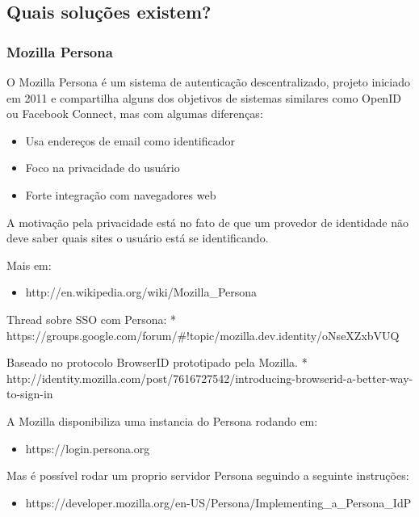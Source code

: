 \documentclass[11pt]{article}
\begin{document}

\subsection{Quais soluções existem?}

\subsubsection{Mozilla Persona}

O Mozilla Persona é um sistema de autenticação descentralizado, projeto
iniciado em 2011 e compartilha alguns dos objetivos de sistemas similares como
OpenID ou Facebook Connect, mas com algumas diferenças:

\begin{itemize}
  \item{Usa endereços de email como identificador}
  \item{Foco na privacidade do usuário}
  \item{Forte integração com navegadores web}
\end{itemize}

A motivação pela privacidade está no fato de que um provedor de identidade não
deve saber quais sites o usuário está se identificando.

Mais em:
\begin{itemize}
  \item{http://en.wikipedia.org/wiki/Mozilla\_Persona}
\end{itemize}

Thread sobre SSO com Persona:
   * https://groups.google.com/forum/\#!topic/mozilla.dev.identity/oNseXZxbVUQ

Baseado no protocolo BrowserID prototipado pela Mozilla.
* http://identity.mozilla.com/post/7616727542/introducing-browserid-a-better-way-to-sign-in

A Mozilla disponibiliza uma instancia do Persona rodando em:

\begin{itemize}
  \item{https://login.persona.org}
\end{itemize}

Mas é possível rodar um proprio servidor Persona seguindo a seguinte
instruções:

\begin{itemize}
  \item{https://developer.mozilla.org/en-US/Persona/Implementing\_a\_Persona\_IdP}
\end{itemize}
\end{document}
